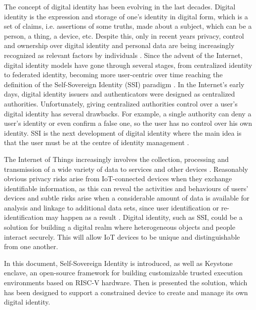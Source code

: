 
The concept of digital identity has been evolving in the last decades. Digital identity is the expression and storage of one's identity in digital form, which is a set of claims, i.e. assertions of some truths, made about a subject, which can be a person, a thing, a device, etc. Despite this, only in recent years privacy, control and ownership over digital identity and personal data are being increasingly recognized as relevant factors by individuals \cite{TheLawsOfIdentity}. 
Since the advent of the Internet, digital identity models have gone through several stages, from centralized identity to federated identity, becoming more user-centric over time reaching the definition of the Self-Sovereign Identity (SSI) paradigm \cite{ThePathToSSI}.
In the Internet's early days, digital identity issuers and authenticators were designed as centralized authorities. Unfortunately, giving centralized authorities control over a user's digital identity has several drawbacks. For example, a single authority can deny a user's identity or even confirm a false one, so the user has no control over his own identity. SSI is the next development of digital identity where the main idea is that the user must be at the centre of identity management \cite{ThePathToSSI}.


The Internet of Things increasingly involves the collection, processing and transmission of a wide variety of data to services and other devices \cite{wilson2018digital}. Reasonably obvious privacy risks arise from IoT-connected devices when they exchange identifiable information, as this can reveal the activities and behaviours of users' devices and subtle risks arise when a considerable amount of data is available for analysis and linkage to additional data sets, since user identification or re-identification may happen as a result \cite{wilson2018digital}. Digital identity, such as SSI, could be a solution for building a digital realm where heterogeneous objects and people interact securely. This will allow IoT devices to be unique and distinguishable from one another.


In this document, Self-Sovereign Identity is introduced, as well as Keystone enclave, an open-source framework for building customizable trusted execution environments based on RISC-V hardware. Then is presented the solution, which has been designed to support a constrained device to create and manage its own digital identity. 


